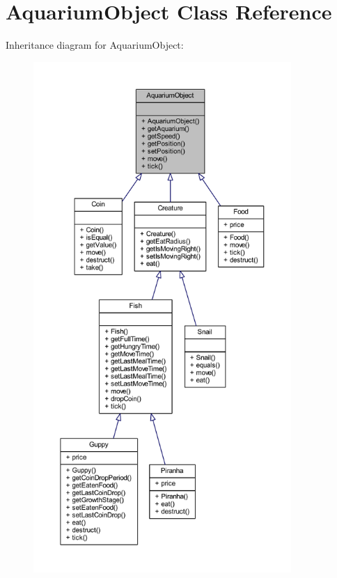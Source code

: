 \hypertarget{class_aquarium_object}{}\section{Aquarium\+Object Class Reference}
\label{class_aquarium_object}


Inheritance diagram for Aquarium\+Object\+:
\nopagebreak
\begin{figure}[H]
\begin{center}
\leavevmode
\includegraphics[height=550pt]{class_aquarium_object__inherit__graph}
\end{center}
\end{figure}


